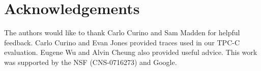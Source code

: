 \section*{Acknowledgements}

The authors would like to thank Carlo Curino and Sam Madden for helpful feedback. Carlo Curino and Evan Jones provided traces used in our TPC-C evaluation. Eugene Wu and Alvin Cheung also provided useful advice. This work was supported by the NSF (CNS-0716273) and Google.


